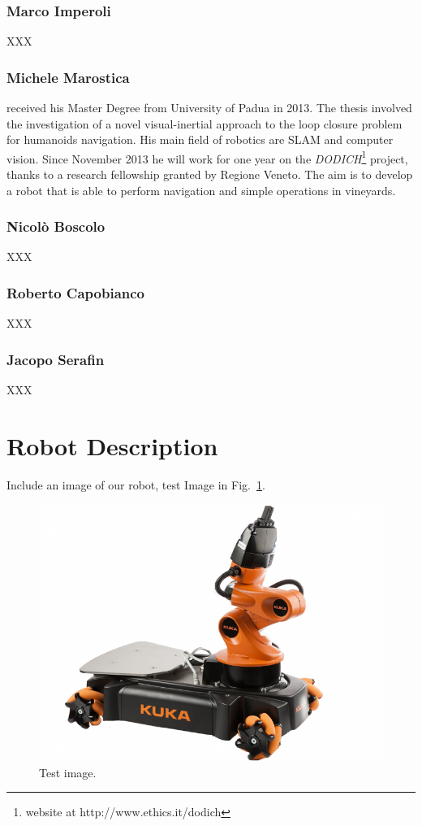 \documentclass[conference]{IEEEtran}
\begin{document}
\subsubsection{Marco Imperoli}
XXX
\subsubsection{Michele Marostica}
received his Master Degree from University of Padua in 2013. The thesis involved the investigation of a novel visual-inertial approach to the loop closure problem for humanoids navigation. His main field of robotics are SLAM and computer vision.
Since November 2013 he will work for one year on the \textit{DODICH}\footnote{website at http://www.ethics.it/dodich} project, thanks to a research fellowship granted by Regione Veneto.
The aim is to develop a robot that is able to perform navigation and simple operations in vineyards.
\subsubsection{Nicolò Boscolo}
XXX
\subsubsection{Roberto Capobianco}
XXX
\subsubsection{Jacopo Serafin}
XXX


\section{Robot Description}
Include an image of our robot, test Image in Fig.~\ref{fig:test_img}.\\
\begin{figure}[t!]
\begin{center}
\includegraphics[angle=0,width=\linewidth]{images/test_img.png}
\end{center}
\caption{Test image.}\label{fig:test_img}
\end{figure}
\end{document}
